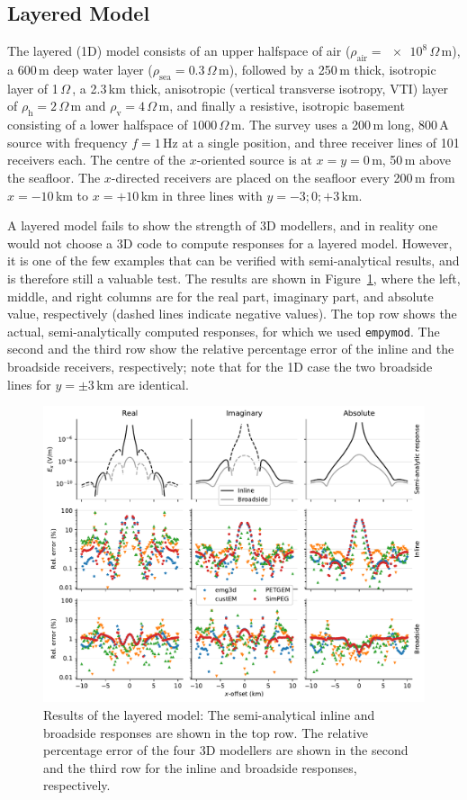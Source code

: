 \documentclass[onecolumn,extra,camera]{gji}
\newcommand{\empymod}{\texttt{empymod}\xspace}
\newcommand{\ohmm}{\ensuremath{\Omega\,}\text{m}\xspace}
\begin{document}
\subsection{Layered Model}

The layered (1D) model consists of an upper halfspace of air ($\rho_\text{air}=\num{e8}\,\ohmm$), a 600\,m deep water layer ($\rho_\text{sea}=0.3\,\ohmm$), followed by a 250\,m thick, isotropic layer of 1\,\ohmm, a 2.3\,km thick, anisotropic (vertical transverse isotropy, VTI) layer of $\rho_\text{h}=2\,\ohmm$ and $\rho_\text{v}=4\,\ohmm$, and finally a resistive, isotropic basement consisting of a lower halfspace of $1000\,\ohmm$. The survey uses a 200\,m long, 800\,A source  with frequency $f=1\,$Hz at a single position, and three receiver lines of 101 receivers each. The centre of the $x$-oriented source is at $x=y=0\,$m, 50\,m above the seafloor. The $x$-directed receivers are placed on the seafloor every 200\,m from $x=-10\,$km to $x=+10\,$km in three lines with $y=-3; 0; +3\,$km.

A layered model fails to show the strength of 3D modellers, and in reality one would not choose a 3D code to compute responses for a layered model. However, it is one of the few examples that can be verified with semi-analytical results, and is therefore still a valuable test. The results are shown in Figure~\ref{fig:results-layered}, where the left, middle, and right columns are for the real part, imaginary part, and absolute value, respectively (dashed lines indicate negative values). The top row shows the actual, semi-analytically computed responses, for which we used \empymod\citep{GEO.17.Werthmuller}. The second and the third row show the relative percentage error of the inline and the broadside receivers, respectively; note that for the 1D case the two broadside lines for $y=\pm3\,$km are identical.
%
\begin{figure}
  \centering
  \includegraphics[width=.9\linewidth]{figures/results-layered}
  \caption{Results of the layered model: The semi-analytical inline and broadside responses are shown in the top row. The relative percentage error of the four 3D modellers are shown in the second and the third row for the inline and broadside responses, respectively.}
  \label{fig:results-layered}
\end{figure}
%
\end{document}

